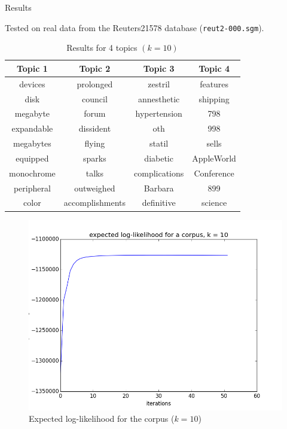 \documentclass[final]{beamer}
\newlength{\onecolwid}
\begin{document}
\begin{frame}[t]
\begin{columns}[t]
\begin{column}{\onecolwid}

\begin{block}{Results}

Tested on real data from the Reuters21578 database (\texttt{reut2-000.sgm}).

\begin{table}
\vspace{2ex}
\begin{footnotesize}
\begin{tabular}{c c c c}
\toprule
\textbf{Topic 1} & \textbf{Topic 2} & \textbf{Topic 3}  & \textbf{Topic 4}\\
\midrule
devices & prolonged & zestril & features \\
disk & council & annesthetic &  shipping  \\
megabyte & forum & hypertension & 798  \\
expandable & dissident & oth & 998  \\
megabytes & flying & statil & sells  \\
equipped &  sparks & diabetic & AppleWorld  \\
monochrome &talks & complications & Conference  \\
peripheral & outweighed & Barbara & 899  \\
color & accomplishments & definitive & science  \\
\bottomrule
\end{tabular}
\end{footnotesize}
\caption{Results for 4 topics $(k=10)$}
\end{table}

\begin{figure}[ht!]
\begin{center}
\includegraphics[width=0.5\linewidth]{../img/k=10/log_likelihood_corpus_k=10.png}
\caption{Expected log-likelihood for the corpus ($k=10$)}
\end{center}
\end{figure}


\end{block}
\end{column}
\end{columns}
\end{frame}
\end{document}
